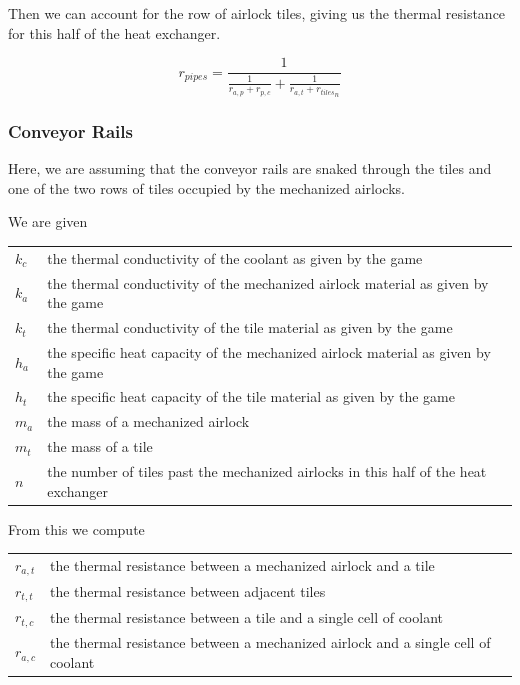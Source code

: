 \documentclass{article}
\numberwithin{equation}{subsection}
\theoremstyle{remark}
\newenvironment{definitiontable}{
\renewcommand{\arraystretch}{1.5}
\begin{tabular}{lp{0.8\textwidth}}
}
{
\end{tabular}
\renewcommand{\arraystretch}{1.0}
}
\begin{document}
Then we can account for the row of airlock tiles, giving us the thermal resistance for this half of the heat exchanger.

\begin{equation}
r_{pipes} = \frac{1}{\frac{1}{r_{a,p} + r_{p,c}} + \frac{1}{r_{a,t} + {r_{tiles}}_{n}}}
\end{equation}

\subsubsection{Conveyor Rails}

Here, we are assuming that the conveyor rails are snaked through the tiles and one of the two rows of tiles occupied by the mechanized airlocks.

We are given

\begin{definitiontable}
\(k_{c}\) & the thermal conductivity of the coolant as given by the game \\

\(k_{a}\) & the thermal conductivity of the mechanized airlock material as given by the game \\

\(k_{t}\) & the thermal conductivity of the tile material as given by the game \\

\(h_{a}\) & the specific heat capacity of the mechanized airlock material as given by the game \\

\(h_{t}\) & the specific heat capacity of the tile material as given by the game \\

\(m_{a}\) & the mass of a mechanized airlock \\

\(m_{t}\) & the mass of a tile \\

\(n\) & the number of tiles past the mechanized airlocks in this half of the heat exchanger
\end{definitiontable}

From this we compute

\begin{definitiontable}
\(r_{a,t}\) & the thermal resistance between a mechanized airlock and a tile \\

\(r_{t,t}\) & the thermal resistance between adjacent tiles \\

\(r_{t,c}\) & the thermal resistance between a tile and a single cell of coolant \\

\(r_{a,c}\) & the thermal resistance between a mechanized airlock and a single cell of coolant \\
\end{definitiontable}
\end{document}
